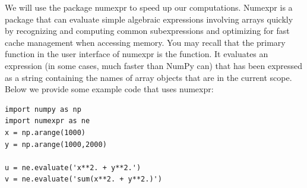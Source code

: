 
We will use the package numexpr to speed up our computations. 
Numexpr is a package that can evaluate simple algebraic expressions involving arrays quickly by recognizing and computing common subexpressions and optimizing for fast cache management when accessing memory.
You may recall that the primary function in the user interface of numexpr is the  function.
It evaluates an expression (in some cases, much faster than NumPy can) that has been expressed as a string containing the names of array objects that are in the current scope.
Below we provide some example code that uses numexpr:
\begin{lstlisting}
import numpy as np
import numexpr as ne
x = np.arange(1000)
y = np.arange(1000,2000)

u = ne.evaluate('x**2. + y**2.')
v = ne.evaluate('sum(x**2. + y**2.)')
\end{lstlisting}




